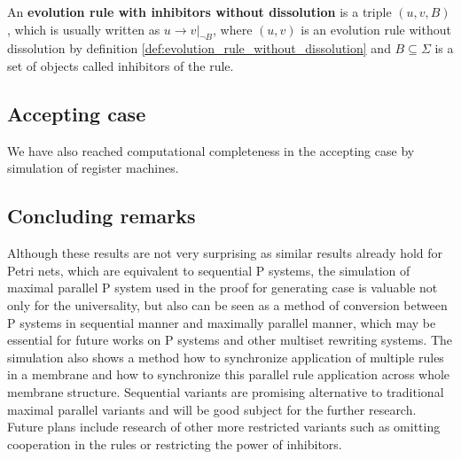 \begin{definition}
  An {\bf evolution rule with inhibitors without dissolution} is a triple $(u,v,B)$, which is usually written as $u\rightarrow v|_{\neg B}$, where $(u,v)$ is an evolution rule without dissolution by definition \ref{def:evolution_rule_without_dissolution} and $B\subseteq\Sigma$ is a set of objects called inhibitors of the rule.
\end{definition}




\subsection{Accepting case} %
\label{sub:accepting_case}

We have also reached computational completeness in the accepting case by simulation of  register machines.




\subsection{Concluding remarks} %
\label{sub:concluding_remarks_of_inhibitors}

Although these results are not very surprising as similar results already hold for Petri nets, which are equivalent to sequential P systems, the simulation of maximal parallel P system used in the proof for generating case is valuable not only for the universality, but also can be seen as a method of conversion between P systems in sequential manner and maximally parallel manner, which may be essential for future works on P systems and other multiset rewriting systems. The simulation also shows a method how to synchronize application of multiple rules in a membrane and how to synchronize this parallel rule application across whole membrane structure. Sequential variants are promising alternative to traditional maximal parallel variants and will be good subject for the further research. Future plans include research of other more restricted variants such as omitting cooperation in the rules or restricting the power of inhibitors.

